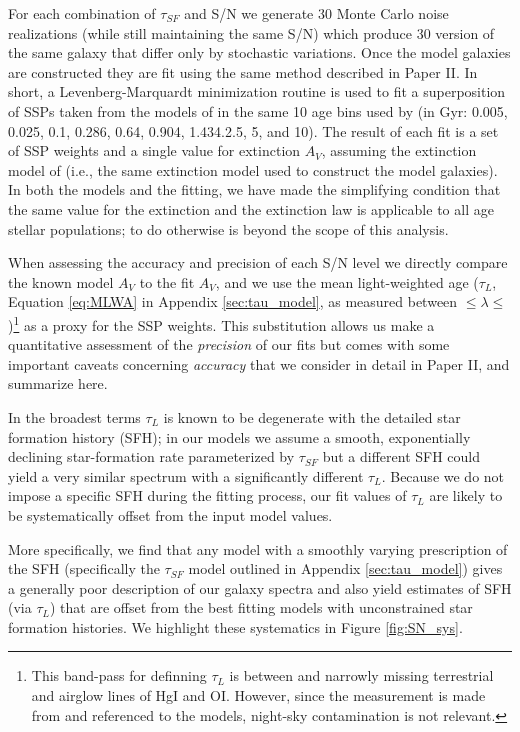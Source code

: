 
For each combination of $\tau_{SF}$ and S/N we generate 30 Monte Carlo
noise realizations (while still maintaining the same S/N) which
produce 30 version of the same galaxy that differ only by stochastic
variations. Once the model galaxies are constructed they are fit using
the same method described in Paper II. In short, a Levenberg-Marquardt
minimization routine is used to fit a superposition of SSPs taken from
the models of \citet{Bruzual03} in the same 10 age bins used by
\citet{Tremonti04} (in Gyr: 0.005, 0.025, 0.1, 0.286, 0.64, 0.904,
1.434.2.5, 5, and 10). The result of each fit is a set of SSP weights
and a single value for extinction $A_V$, assuming the extinction model
of \citet{Charlot00} (i.e., the same extinction model used to
construct the model galaxies). In both the models and the fitting, we
have made the simplifying condition that the same value for the
extinction and the extinction law is applicable to all age stellar
populations; to do otherwise is beyond the scope of this analysis.

When assessing the accuracy and precision of each S/N level we
directly compare the known model $A_V$ to the fit $A_V$, and we use
the mean light-weighted age ($\tau_L$, Equation \ref{eq:MLWA} in
Appendix \ref{sec:tau_model}, as measured between 
$\leq\lambda\leq$ )\footnote{ This band-pass for
  definning $\tau_L$ is between and narrowly missing terrestrial and
  airglow lines of HgI and OI. However, since the measurement is made
  from and referenced to the models, night-sky contamination is not
  relevant.}  as a proxy for the SSP weights. This substitution allows
us make a quantitative assessment of the {\it precision} of our fits
but comes with some important caveats concerning {\it accuracy} that
we consider in detail in Paper II, and summarize here.

In the broadest terms $\tau_L$ is known to be degenerate with the
detailed star formation history (SFH); in our models we assume a
smooth, exponentially declining star-formation rate parameterized by
$\tau_{SF}$ but a different SFH could yield a very similar spectrum
with a significantly different $\tau_L$.  Because we do not impose a
specific SFH during the fitting process, our fit values of $\tau_L$
are likely to be systematically offset from the input model values.

More specifically, we find that any model with a smoothly varying
prescription of the SFH (specifically the $\tau_{SF}$ model outlined
in Appendix \ref{sec:tau_model}) gives a generally poor description of
our galaxy spectra and also yield estimates of SFH (via $\tau_L$) that
are offset from the best fitting models with unconstrained star
formation histories. We highlight these systematics in Figure
\ref{fig:SN_sys}.

